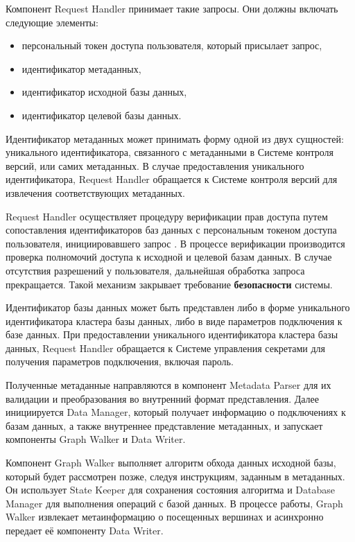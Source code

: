 Компонент Request Handler принимает такие запросы. Они должны включать следующие элементы:

\begin{itemize}
  \item персональный токен доступа пользователя, который присылает запрос,
  \item идентификатор метаданных,
  \item идентификатор исходной базы данных,
  \item идентификатор целевой базы данных.
\end{itemize}

Идентификатор метаданных может принимать форму одной из двух сущностей: уникального идентификатора, связанного с метаданными в Системе контроля версий, или самих метаданных. В случае предоставления уникального идентификатора, Request Handler обращается к Системе контроля версий для извлечения соответствующих метаданных.

Request Handler осуществляет процедуру верификации прав доступа путем сопоставления идентификаторов баз данных с персональным токеном доступа пользователя, инициировавшего запрос \cite{oauth}. В процессе верификации производится проверка полномочий доступа к исходной и целевой базам данных. В случае отсутствия разрешений у пользователя, дальнейшая обработка запроса прекращается. Такой механизм закрывает требование \textbf{безопасности} системы.

Идентификатор базы данных может быть представлен либо в форме уникального идентификатора кластера базы данных, либо в виде параметров подключения к базе данных. При предоставлении уникального идентификатора кластера базы данных, Request Handler обращается к Системе управления секретами для получения параметров подключения, включая пароль.

Полученные метаданные направляются в компонент Metadata Parser для их валидации и преобразования во внутренний формат представления. Далее инициируется Data Manager, который получает информацию о подключениях к базам данных, а также внутреннее представление метаданных, и запускает компоненты Graph Walker и Data Writer.

Компонент Graph Walker выполняет алгоритм обхода данных исходной базы, который будет рассмотрен позже, следуя инструкциям, заданным в метаданных. Он использует State Keeper для сохранения состояния алгоритма и Database Manager для выполнения операций с базой данных. В процессе работы, Graph Walker извлекает метаинформацию о посещенных вершинах и асинхронно передает её компоненту Data Writer.

